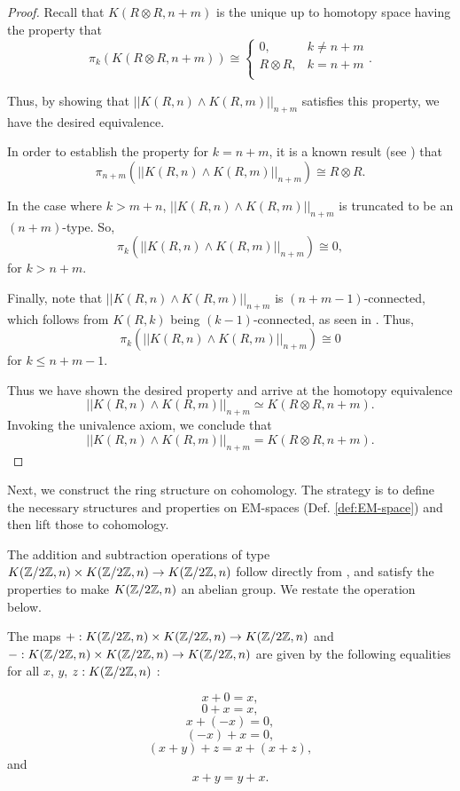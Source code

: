 \documentclass{amsart}
\begin{document}
\begin{proof}
	Recall that $K(R \otimes R, n+m)$ is the unique up to homotopy space
	having the property that
	\[
	\pi_k (K(R \otimes R, n+m )) \cong
	\begin{cases}
	0, & k \neq n+m \\
	R \otimes R, & k= n+m \\
	\end{cases}
	.\]
	
	Thus, by showing that $ || K(R,n) \wedge K(R,m) ||_{n+m} $
	satisfies this property, we have the desired
	equivalence. 
	
	In order to establish the property for $k=n+m$, it is a known result (see \cite[Prop 19.60]{strom:mcht}) that
	\[
	\pi_{n+m} ( || K(R,n) \wedge K(R,m) ||_{n+m} )
	\cong R \otimes R.
	\]
	
	In the case where $k>m+n$, 
	 $ || K(R,n) \wedge K(R,m) ||_{n+m} $
	is truncated to be an $ ( n+m ) $-type. So, \[
	\pi_k ( || K(R,n) \wedge K(R,m) ||_{n+m} )
	\cong 0,
	\] for $k>n+m$. 
	
	Finally, note that  
	$ || K(R,n) \wedge K(R,m) ||_{n+m} $ is
	$ ( n+m-1 ) $-connected, which follows from $ K( R,k ) $ being
	$ ( k-1 ) $-connected, as seen in \cite[Prop 4.3.1]{brunerie:thesis}.
	Thus,
	\[
	\pi_k (|| K(R,n) \wedge K(R,m) ||_{n+m} ) \cong 0
	\]
	for $ k \leq n+m-1 $.
	
	Thus we have shown the desired property and arrive at the homotopy equivalence 
	\[
	|| K(R,n) \wedge K(R,m) ||_{n+m} \simeq
	K (R \otimes R, n+m ).
	\]
	Invoking the univalence axiom, we conclude that
	\[
	|| K(R,n) \wedge K(R,m) ||_{n+m} =
	K (R \otimes R, n+m ).
	\]
\end{proof}



Next, we construct the ring structure on cohomology. The
strategy is to define the necessary structures and properties on EM-spaces (Def. \ref{def:EM-space})
and then lift those to cohomology.



The addition and subtraction
operations of type $ K(\mathbb{Z}/2\mathbb{Z},n) \times K(\mathbb{Z}/2\mathbb{Z},n) \to K(\mathbb{Z}/2\mathbb{Z},n) $ follow
directly from \cite{brunerie:thesis}, and satisfy the properties to make $K(\mathbb{Z}/2\mathbb{Z},n)$ an abelian group. We restate the operation below.


\begin{proposition}\cite[Prop. 5.1.4]{brunerie:thesis}
	The maps $ +: K(\mathbb{Z}/2\mathbb{Z},n) \times K(\mathbb{Z}/2\mathbb{Z},n) \to K(\mathbb{Z}/2\mathbb{Z},n) $ and $-: K(\mathbb{Z}/2\mathbb{Z},n) \times K(\mathbb{Z}/2\mathbb{Z},n) \to K(\mathbb{Z}/2\mathbb{Z},n) $ are given by the following equalities for all $x$, $y$, $z:K(\mathbb{Z}/2\mathbb{Z},n)$ :
	
	\[x+0=x,\]
	\[0+x=x,\]
	\[x+(-x)=0,\]
	\[(-x)+x=0,\]
	\[(x+y)+z=x+(x+z),\]
	and
	\[x+y=y+x.\]
	
	\end{proposition}
\end{document}
